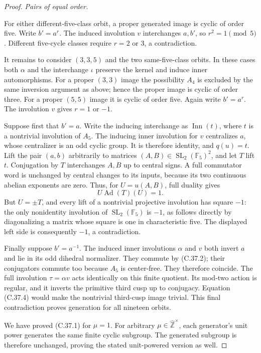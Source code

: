 \begin{proof}
\emph{Pairs of equal order.}\par
For either different-five-class orbit, a proper generated
image is cyclic of order five. Write \(b'=a^r\).
The induced involution \(v\) interchanges \(a,b'\),
so \(r^2=1\pmod5\). Different five-cycle classes
require \(r=2\) or \(3\), a contradiction.

It remains to consider \((3,3,5)\) and the two same-five-class
orbits. In these cases both \(\alpha\) and the interchange
\(\iota\) preserve the kernel and induce inner
automorphisms. For a proper \((3,3)\) image the possibility
\(A_4\) is excluded by the same inversion argument as
above; hence the proper image is cyclic of order three.
For a proper \((5,5)\) image it is cyclic of order five.
Again write \(b'=a^r\). The involution \(v\) gives
\(r=1\) or \(-1\).

Suppose first that \(b'=a\). Write the inducing interchange
as \(\operatorname{Inn}(t)\), where \(t\) is a nontrivial
involution of \(A_5\). The inducing inner involution for
\(v\) centralizes \(a\), whose centralizer is an odd
cyclic group. It is therefore identity, and \(q(u)=t\).
Lift the pair \((a,b)\) arbitrarily to matrices
\((A,B)\in\operatorname{SL}_2(\mathbb F_5)^2\), and
let \(T\) lift \(t\). Conjugation by \(T\) interchanges
\(A,B\) up to central signs. A full commutator word is
unchanged by central changes to its inputs, because its two
continuous abelian exponents are zero. Thus, for
\(U=u(A,B)\), full duality gives
\[
                         U\operatorname{Ad}(T)(U)=1.
\]
But \(U=\pm T\), and every lift of a nontrivial
projective involution has square \(-1\): the only
nonidentity involution of \(\operatorname{SL}_2(\mathbb F_5)\)
is \(-1\), as follows directly by diagonalizing a matrix
whose square is one in characteristic five. The displayed
left side is consequently \(-1\), a contradiction.

Finally suppose \(b'=a^{-1}\). The induced inner
involutions \(\alpha\) and \(v\) both invert \(a\)
and lie in its odd dihedral normalizer. They commute by
(C.37.2); their conjugators commute too because \(A_5\)
is center-free. They therefore coincide. The full involution
\(\tau=\alpha v\) acts identically on this finite
quotient. Its mod-two action is regular, and it inverts the
primitive third cusp up to conjugacy. Equation (C.37.4)
would make the nontrivial third-cusp image trivial. This final
contradiction proves generation for all nineteen orbits.

We have proved (C.37.1) for \(\mu=1\). For arbitrary
\(\mu\in\widehat{\mathbb Z}^{\times}\), each generator's
unit power generates the same finite cyclic subgroup.
The generated subgroup is therefore unchanged, proving
the stated unit-powered version as well.
\end{proof}

